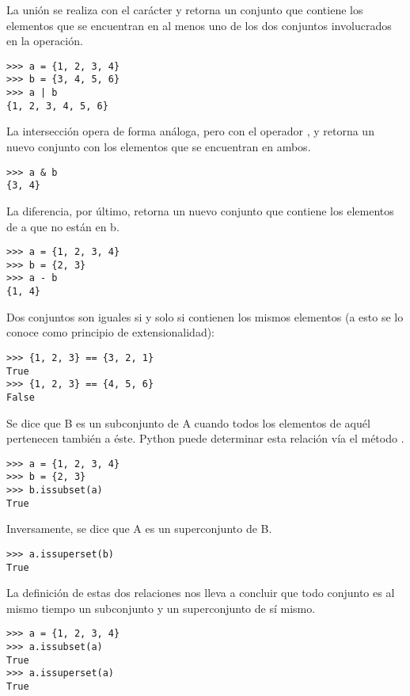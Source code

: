 La unión se realiza con el carácter \pythoninline{|} y retorna un conjunto que contiene los elementos que se encuentran en al menos uno de los dos conjuntos involucrados en la operación.

\begin{Verbatim}[frame=single]
>>> a = {1, 2, 3, 4}
>>> b = {3, 4, 5, 6}
>>> a | b
{1, 2, 3, 4, 5, 6}
\end{Verbatim}

La intersección opera de forma análoga, pero con el operador \pythoninline{&}, y retorna un nuevo conjunto con los elementos que se encuentran en ambos.

\begin{Verbatim}[frame=single]
>>> a & b
{3, 4}
\end{Verbatim}

La diferencia, por último, retorna un nuevo conjunto que contiene los elementos de a que no están en b.

\begin{Verbatim}[frame=single]
>>> a = {1, 2, 3, 4}
>>> b = {2, 3}
>>> a - b
{1, 4}
\end{Verbatim}


Dos conjuntos son iguales si y solo si contienen los mismos elementos (a esto se lo conoce como principio de extensionalidad):

\begin{Verbatim}[frame=single]
>>> {1, 2, 3} == {3, 2, 1}
True
>>> {1, 2, 3} == {4, 5, 6}
False
\end{Verbatim}


Se dice que B es un subconjunto de A cuando todos los elementos de aquél pertenecen también a éste. Python puede determinar esta relación vía el método .

\begin{Verbatim}[frame=single]
>>> a = {1, 2, 3, 4}
>>> b = {2, 3}
>>> b.issubset(a)
True
\end{Verbatim}

Inversamente, se dice que A es un superconjunto de B.

\begin{Verbatim}[frame=single]
>>> a.issuperset(b)
True
\end{Verbatim}

La definición de estas dos relaciones nos lleva a concluir que todo conjunto es al mismo tiempo un subconjunto y un superconjunto de sí mismo.

\begin{Verbatim}[frame=single]
>>> a = {1, 2, 3, 4}
>>> a.issubset(a)
True
>>> a.issuperset(a)
True
\end{Verbatim}

